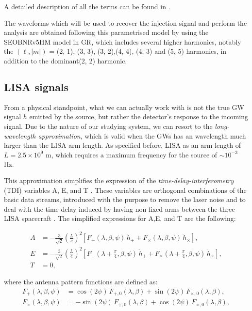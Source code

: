 \noindent 
A detailed description of all the terms can be found in \cite{pompili2023layingfoundationeffectiveonebodywaveform, Cotesta_2018}.

The waveforms which will be used to recover the injection signal and perform the analysis are obtained following this parametrised model by using the SEOBNRv5HM model \cite{pompili2023layingfoundationeffectiveonebodywaveform} in GR, which includes several higher harmonics, notably the $(\ell , |m|) $ = (2, 1), (3, 3), (3, 2),(4, 4), (4, 3) and (5, 5) harmonics, in addition to the dominant(2, 2) harmonic.

\subsection{LISA signals}

From a physical standpoint, what we can actually work with is not the true GW signal $h$ emitted by the source, but rather the detector's response to the incoming signal.
Due to the nature of our studying system, we can resort to the \textit{long-wavelength approximation}, which is valid when the GWs has an wavelength much larger than the LISA arm length. As specified before, LISA as an arm length of $ L = 2.5 \times 10^9 $ m, which requires a maximum frequency for the source of $\sim 10^{-3}$ Hz. 

This approximation simplifies the expression of the \textit{time-delay-interferometry} (TDI) variables A, E, and T \cite{Tinto_2005}. These variables are orthogonal combinations of the basic data streams, introduced with the purpose to remove the laser noise and to deal with the time delay induced by having non fixed arms between the three LISA spacecraft \cite{Hartwig_2022}. The simplified expressions for A,E, and T are the following:

\begin{align}
A &= -\frac{3}{\sqrt{2}} \left( \frac{L}{c} \right)^2 \left[ F_+(\lambda, \beta, \psi)\, \ddot{h}_+ + F_\times(\lambda, \beta, \psi)\, \ddot{h}_\times \right], \\
E &= -\frac{3}{\sqrt{2}} \left( \frac{L}{c} \right)^2 \left[ F_+(\lambda + \tfrac{\pi}{4}, \beta, \psi)\, \ddot{h}_+ + F_\times(\lambda + \tfrac{\pi}{4}, \beta, \psi)\, \ddot{h}_\times \right], \\
T &= 0,
\end{align}

where the antenna pattern functions are defined as:
\begin{align}
F_+(\lambda, \beta, \psi) &= \cos(2\psi)\, F_{+,0}(\lambda, \beta) + \sin(2\psi)\, F_{\times,0}(\lambda, \beta), \\
F_\times(\lambda, \beta, \psi) &= -\sin(2\psi)\, F_{+,0}(\lambda, \beta) + \cos(2\psi)\, F_{\times,0}(\lambda, \beta),
\end{align}

